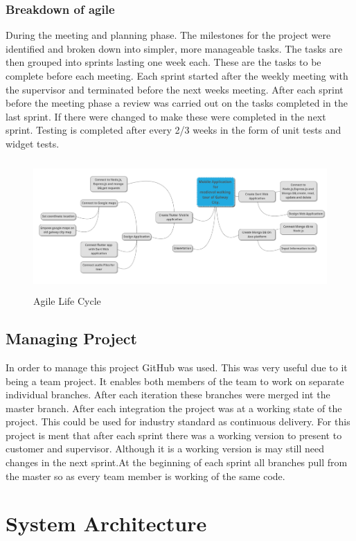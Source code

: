 \subsubsection{Breakdown of agile}
During the meeting and planning phase. The milestones for the project were identified and broken down into simpler, more manageable tasks. The tasks are then grouped into sprints lasting one week each. These are the tasks to be complete before each meeting. Each sprint started after the weekly meeting with the supervisor and terminated before the next weeks meeting. After each sprint before the meeting phase a review was carried out on the tasks completed in the last sprint. If there were changed to make these were completed in the next sprint. Testing is completed after every 2/3 weeks in the form of unit tests and widget tests.\cite{Agile}

\begin{figure}[ht]
    \centering
 \includegraphics[width=135mm, height=50mm,scale=0.5]{img/plan.png}
\caption{Agile Life Cycle}
\label{fig:Project Plan}
\end{figure}

\subsection{Managing Project}
In order to manage this project GitHub was used. This was very useful due to it being a team project. It enables both members of the team to work on separate individual branches. After each iteration these branches were merged int the master branch. After each integration the project was at a working state of the project. This could be used for industry standard as continuous delivery. For this project is ment that after each sprint there was a working version to present to customer and supervisor. Although it is a working version is may still need changes in the next sprint.At the beginning of each sprint all branches pull from the master so as every team member is working of the same code.
\section{System Architecture}
